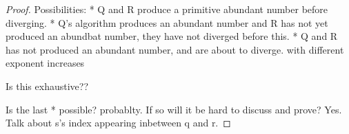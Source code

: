 \documentclass[../paper.tex]{subfiles}
\begin{document}
\begin{proof}
Possibilities:
  * Q and R produce a primitive abundant number before diverging.
  * Q's algorithm produces an abundant number and R has not yet produced an
abundbat number, they have not diverged before this.
  * Q and R has not produced an abundant number, and are about to
diverge. with different exponent increases

Is this exhaustive??

Is the last * possible? probablty. If so will it be hard to
discuss and prove? Yes. Talk about s's index appearing inbetween
q and r.


\end{proof}















% 



%

\end{document}
